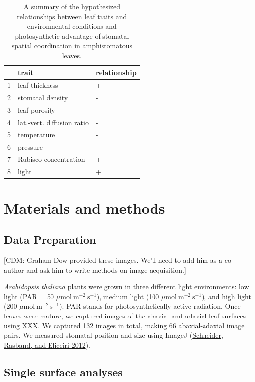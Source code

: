 \documentclass[12pt,halfline,a4paper,]{ouparticle}
\begin{document}
\begin{table}[ht]
\centering
\begin{tabular}{rll}
  \hline
 & trait & relationship \\ 
  \hline
1 & leaf thickness & + \\ 
  2 & stomatal density & - \\ 
  3 & leaf porosity & - \\ 
  4 & lat.-vert. diffusion ratio & - \\ 
  5 & temperature & - \\ 
  6 & pressure & - \\ 
  7 & Rubisco concentration & + \\ 
  8 & light & + \\ 
   \hline
\end{tabular}
\caption{A summary of the hypothesized relationships between leaf traits and environmental conditions and photosynthetic advantage of stomatal spatial coordination in amphistomatous leaves.} 
\label{tab:hypotheses}
\end{table}

\hypertarget{materials-and-methods}{%
\section{Materials and methods}\label{materials-and-methods}}

\hypertarget{data-preparation}{%
\subsection{Data Preparation}\label{data-preparation}}

{[}CDM: Graham Dow provided these images. We'll need to add him as a
co-author and ask him to write methods on image acquisition.{]}

\emph{Arabidopsis thaliana} plants were grown in three different light
environments: low light (PAR = 50
\(\mu \text{mol}~\text{m}^{-2}~\text{s}^{-1}\)), medium light (100
\(\mu \text{mol}~\text{m}^{-2}~\text{s}^{-1}\)), and high light (200
\(\mu \text{mol}~\text{m}^{-2}~\text{s}^{-1}\)). PAR stands for
photosynthetically active radiation. Once leaves were mature, we
captured images of the abaxial and adaxial leaf surfaces using XXX. We
captured 132 images in total, making 66 abaxial-adaxial image pairs. We
measured stomatal position and size using ImageJ
(\protect\hyperlink{ref-schneider_nih_2012}{Schneider, Rasband, and
Eliceiri 2012}).

\hypertarget{single-surface-analyses}{%
\subsection{Single surface analyses}\label{single-surface-analyses}}
\end{document}
